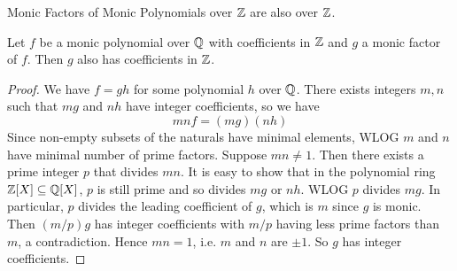 \documentclass[../book.tex]{subfiles}
\begin{document}
\begin{lem} Monic Factors of Monic Polynomials over $\mathbb{Z}$ are also over $\mathbb{Z}$.
    
    Let $f$ be a monic polynomial over $\mathbb{Q}$ with coefficients in $\mathbb{Z}$
    and $g$ a monic factor of $f$.
    Then $g$ also has coefficients in $\mathbb{Z}$. 
    
\end{lem}
\begin{proof}
    
    We have $f = g h$ for some polynomial $h$ over $\mathbb{Q}$.
    There exists integers $m, n$ such that $m g$ and $n h$ have integer coefficients,
    so we have \[
        m n f = (m g) (n h)
    \]
    Since non-empty subsets of the naturals have minimal elements,
    WLOG $m$ and $n$ have minimal number of prime factors.
    Suppose $m n \neq 1$.
    Then there exists a prime integer $p$ that divides $m n$.
    It is easy to show that in the polynomial ring $\mathbb{Z}[X] \subseteq \mathbb{Q}[X]$,
    $p$ is still prime and so divides $m g$ or $n h$.
    WLOG $p$ divides $m g$.
    In particular, $p$ divides the leading coefficient of $g$, 
    which is $m$ since $g$ is monic.
    Then $(m / p) g$ has integer coefficients 
    with $m / p$ having less prime factors than $m$, a contradiction.
    Hence $m n = 1$, i.e. $m$ and $n$ are $\pm 1$.
    So $g$ has integer coefficients. 
\end{proof}
\end{document}
